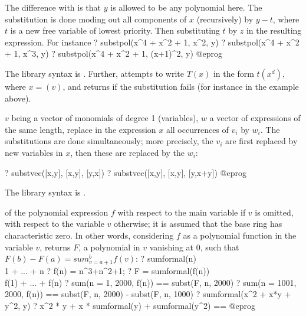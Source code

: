 The difference with  is that $y$ is allowed to be any polynomial
here. The substitution is done moding out all components of $x$
(recursively) by $y - t$, where $t$ is a new free variable of lowest
priority. Then substituting $t$ by $z$ in the resulting expression. For
instance
\bprog
? substpol(x^4 + x^2 + 1, x^2, y)
? substpol(x^4 + x^2 + 1, x^3, y)
? substpol(x^4 + x^2 + 1, (x+1)^2, y)
@eprog

The library syntax is .
Further,  attempts to
write $T(x)$ in the form $t(x^d)$, where $x=$$(v)$, and returns
 if the substitution fails (for instance in the example 
above).

\label{se:substvec}
$v$ being a vector of monomials of degree 1 (variables),
$w$ a vector of expressions of the same length, replace in the expression
$x$ all occurrences of $v_i$ by $w_i$. The substitutions are done
simultaneously; more precisely, the $v_i$ are first replaced by new
variables in $x$, then these are replaced by the $w_i$:

\bprog
? substvec([x,y], [x,y], [y,x])
? substvec([x,y], [x,y], [y,x+y])
@eprog

The library syntax is .

\label{se:sumformal}
 of the polynomial expression $f$ with respect to the
main variable if $v$ is omitted, with respect to the variable $v$ otherwise;
it is assumed that the base ring has characteristic zero. In other words,
considering $f$ as a polynomial function in the variable $v$,
returns $F$, a polynomial in $v$ vanishing at $0$, such that $F(b) - F(a)
= sum_{v = a+1}^b f(v)$:
\bprog
? sumformal(n)  \\ 1 + ... + n
? f(n) = n^3+n^2+1;
? F = sumformal(f(n))  \\ f(1) + ... + f(n)
? sum(n = 1, 2000, f(n)) == subst(F, n, 2000)
? sum(n = 1001, 2000, f(n)) == subst(F, n, 2000) - subst(F, n, 1000)
? sumformal(x^2 + x*y + y^2, y)
? x^2 * y + x * sumformal(y) + sumformal(y^2) == %
@eprog

